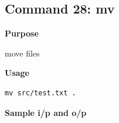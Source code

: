 \subsection{Command 28: mv} 
\textbf{Purpose}
\begin{flushleft}
 move files
\end{flushleft}
\textbf{Usage}
\begin{verbatim}
mv src/test.txt .
\end{verbatim}
\textbf{Sample i/p and o/p}
\begin{figure}[H] 
\end{figure}
